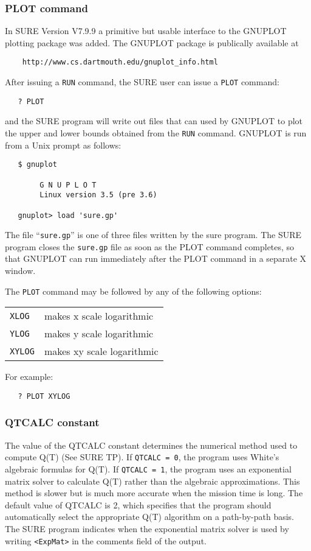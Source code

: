 \subsubsection{PLOT command}
In SURE Version V7.9.9 a primitive but usable interface to the GNUPLOT plotting
package was added.  The GNUPLOT package is publically available at
\begin{verbatim}
    http://www.cs.dartmouth.edu/gnuplot_info.html
\end{verbatim}
After issuing a \verb|RUN| command, the SURE user can issue a \verb|PLOT| command:
\begin{verbatim}
   ? PLOT
\end{verbatim}
and the SURE program will write out files that can used by GNUPLOT to plot the 
upper and lower bounds obtained from the \verb|RUN| command.
GNUPLOT is run from a Unix prompt as follows:
\begin{verbatim}
   $ gnuplot

        G N U P L O T
        Linux version 3.5 (pre 3.6)

   gnuplot> load 'sure.gp'

\end{verbatim}
The file ``\verb|sure.gp|'' is one of three files written by the sure program.   
The SURE program closes the \verb|sure.gp| file as soon as the PLOT
command completes, so that GNUPLOT can run immediately after the PLOT command
in a separate X window.


The \verb|PLOT| command may be followed by any of the following options:
\begin{flushleft}
\begin{tabular}{lp{5.0in}}
   \verb|XLOG| & makes x scale logarithmic \\
   \verb|YLOG| & makes y scale logarithmic \\
   \verb|XYLOG| & makes xy scale logarithmic \\
\end{tabular}
\end{flushleft}
For example:
\begin{verbatim}
   ? PLOT XYLOG
\end{verbatim}





\subsubsection{QTCALC constant} The value
of the {\isf QTCALC} constant determines the numerical method used to compute
Q(T) (See SURE TP).  If \verb|QTCALC = 0|, the program uses White's algebraic
formulas for Q(T).  If \verb|QTCALC = 1|, the program uses an exponential
matrix solver to calculate Q(T) rather than the algebraic approximations.
This method is slower but is much more accurate when the mission time is long.
The default value of {\isf QTCALC} is 2, which specifies that the program
should automatically select the appropriate Q(T) algorithm on a path-by-path
basis.  The SURE program indicates when the exponential matrix solver is used
by writing \verb|<ExpMat>| in the comments field of the output.


